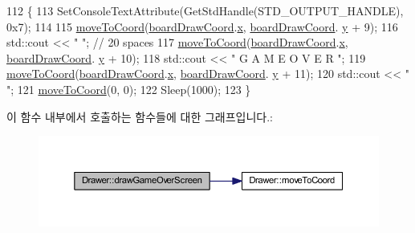 \begin{DoxyCode}
112     \{
113         SetConsoleTextAttribute(GetStdHandle(STD\_OUTPUT\_HANDLE), 0x7);
114         
115         \mbox{\hyperlink{class_drawer_ac1a96e007c07cab2e36a7c78484ee9a6}{moveToCoord}}(\mbox{\hyperlink{tetris__drawer_8h_afe5fa4d0ad1820f448b83de84142af4d}{boardDrawCoord}}.\mbox{\hyperlink{struct_coord_a696eaa744360fc791d0e3b331c549dbe}{x}}, \mbox{\hyperlink{tetris__drawer_8h_afe5fa4d0ad1820f448b83de84142af4d}{boardDrawCoord}}.
      \mbox{\hyperlink{struct_coord_a214166cca70cef7dda9201689c3e81ab}{y}} + 9);
116         std::cout << \textcolor{stringliteral}{"                    "}; \textcolor{comment}{// 20 spaces}
117         \mbox{\hyperlink{class_drawer_ac1a96e007c07cab2e36a7c78484ee9a6}{moveToCoord}}(\mbox{\hyperlink{tetris__drawer_8h_afe5fa4d0ad1820f448b83de84142af4d}{boardDrawCoord}}.\mbox{\hyperlink{struct_coord_a696eaa744360fc791d0e3b331c549dbe}{x}}, \mbox{\hyperlink{tetris__drawer_8h_afe5fa4d0ad1820f448b83de84142af4d}{boardDrawCoord}}.
      \mbox{\hyperlink{struct_coord_a214166cca70cef7dda9201689c3e81ab}{y}} + 10);
118         std::cout << \textcolor{stringliteral}{"  G A M E O V E R   "};
119         \mbox{\hyperlink{class_drawer_ac1a96e007c07cab2e36a7c78484ee9a6}{moveToCoord}}(\mbox{\hyperlink{tetris__drawer_8h_afe5fa4d0ad1820f448b83de84142af4d}{boardDrawCoord}}.\mbox{\hyperlink{struct_coord_a696eaa744360fc791d0e3b331c549dbe}{x}}, \mbox{\hyperlink{tetris__drawer_8h_afe5fa4d0ad1820f448b83de84142af4d}{boardDrawCoord}}.
      \mbox{\hyperlink{struct_coord_a214166cca70cef7dda9201689c3e81ab}{y}} + 11);
120         std::cout << \textcolor{stringliteral}{"                    "};
121         \mbox{\hyperlink{class_drawer_ac1a96e007c07cab2e36a7c78484ee9a6}{moveToCoord}}(0, 0);
122         Sleep(1000);
123     \}
\end{DoxyCode}
이 함수 내부에서 호출하는 함수들에 대한 그래프입니다.\+:
\nopagebreak
\begin{figure}[H]
\begin{center}
\leavevmode
\includegraphics[width=350pt]{class_drawer_a57ec099eb46c93f20d9221a2244dd9a7_cgraph}
\end{center}
\end{figure}
